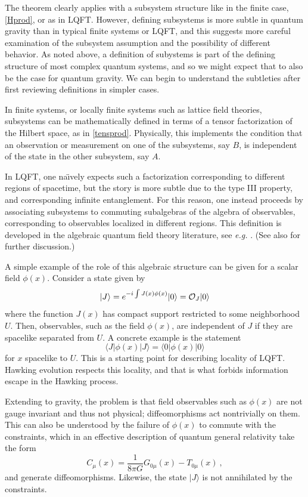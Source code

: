 \documentclass[12pt]{article}
\numberwithin{equation}{section}
\newcommand{\beq}{\begin{equation}}
\newcommand{\eeq}{\end{equation}}
\begin{document}
The theorem clearly applies with a subsystem structure like in the finite case, \eqref{Hprod}, or as in LQFT.  However, 
defining subsystems is more subtle in quantum gravity than in typical finite systems or LQFT, and this suggests more careful examination of the subsystem assumption and the possibility of different behavior.  
As noted above, a definition of subystems is part of the defining structure of most complex quantum systems, and so we might expect that to also be the case for quantum gravity.  We can begin to understand the subtleties after first reviewing definitions in simpler cases.

In finite systems, or locally finite systems such as lattice field theories, subsystems can be mathematically defined in terms of a tensor factorization of the Hilbert space, as in \eqref{tensprod}.  Physically, this implements the condition that  an observation or measurement on one of the subsystems, say $B$, is independent of the state in the other subsystem, say $A$.  

In LQFT, one na\"\i vely expects such a factorization corresponding to different regions of spacetime, but the story is more subtle due to the type III property, and corresponding infinite entanglement.  For this reason, one instead proceeds by associating subsystems to commuting subalgebras of the algebra of observables, corresponding to observables localized in different regions.  This definition is developed in the algebraic quantum field theory literature, see {\it e.g.} \cite{Haag}.  (See also \cite{SGalg} for further discussion.)

A simple example of the role of this algebraic structure  can be given for a scalar field $\phi(x)$.  Consider a state given by
\beq\label{JstateD}
|J\rangle= e^{-i\int J(x)\phi(x)} |0\rangle = {\cal O}_J|0\rangle
\eeq
where the function $J(x)$ has compact support restricted to some neighborhood $U$.  Then, observables, such as the field $\phi(x)$, are independent of $J$ if they are spacelike separated from $U$.  A concrete example is the statement
\beq\label{Jstate}
\langle J|\phi(x)|J\rangle=\langle0|\phi(x)|0\rangle
\eeq
for $x$ spacelike to $U$.  This is a starting point for describing locality of LQFT. Hawking evolution respects this locality, and that is what forbids information escape in the Hawking process.

Extending to gravity, the problem is that field observables such as $\phi(x)$ are not gauge invariant and thus not physical; diffeomorphisms act nontrivially on them.  This can also be understood by the failure of $\phi(x)$ to commute with the constraints, which in an effective description of quantum general relativity take the form
\beq
C_\mu(x)=\frac{1}{8\pi G} G_{0\mu}(x)-T_{0\mu}(x)\ ,
\eeq
and generate  diffeomorphisms.
Likewise, the state $|J\rangle$ is not annihilated by the constraints.  
\end{document}
